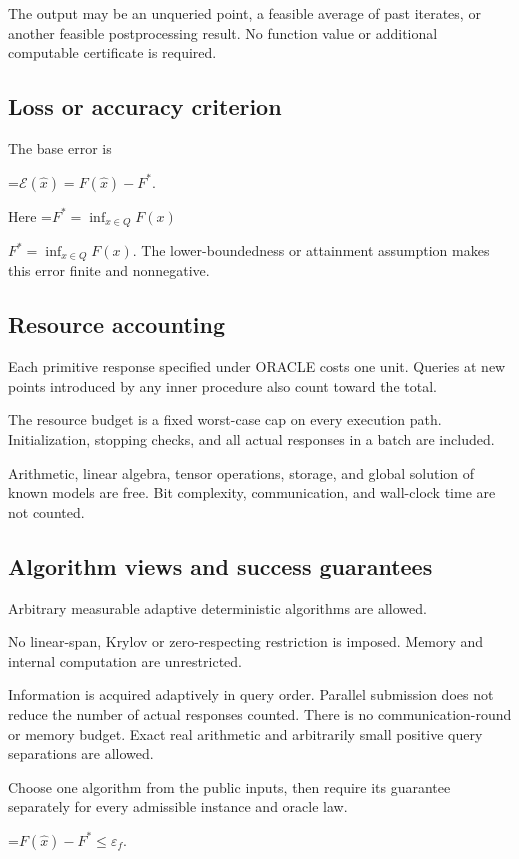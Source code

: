 \documentclass[10pt,a4paper]{article}
\newcommand{\AtlasMath}[1]{\par\begingroup\centering\setbox0=\hbox{$\displaystyle #1$}\ifdim\wd0>1.4\linewidth\typeout{ATLAS WIDE FORMULA: \the\wd0}\fi\ifdim\wd0>\linewidth\resizebox{\linewidth}{!}{\box0}\else\box0\fi\par\endgroup}
\newcommand{\AtlasInlineMath}[1]{\begingroup\setbox0=\hbox{$#1$}\ifdim\wd0>.4\linewidth\endgroup\AtlasMath{#1}\else\endgroup$#1$\fi}
\begin{document}
The output may be an unqueried point, a feasible average of past iterates, or another feasible postprocessing result. No function value or additional computable certificate is required.

\subsection{Loss or accuracy criterion}
The base error is


\AtlasMath{\mathcal{E}(\widehat{x})=F(\widehat{x})-F^*.}


Here \AtlasInlineMath{F^*=\inf_{x\in Q}F(x)}. The lower-boundedness or attainment assumption makes this error finite and nonnegative.

\subsection{Resource accounting}
Each primitive response specified under ORACLE costs one unit. Queries at new points introduced by any inner procedure also count toward the total.

The resource budget is a fixed worst-case cap on every execution path. Initialization, stopping checks, and all actual responses in a batch are included.

Arithmetic, linear algebra, tensor operations, storage, and global solution of known models are free. Bit complexity, communication, and wall-clock time are not counted.

\subsection{Algorithm views and success guarantees}
Arbitrary measurable adaptive deterministic algorithms are allowed.

No linear-span, Krylov or zero-respecting restriction is imposed. Memory and internal computation are unrestricted.

Information is acquired adaptively in query order. Parallel submission does not reduce the number of actual responses counted. There is no communication-round or memory budget. Exact real arithmetic and arbitrarily small positive query separations are allowed.

Choose one algorithm from the public inputs, then require its guarantee separately for every admissible instance and oracle law.


\AtlasMath{F(\widehat{x})-F^*\le \varepsilon_f.}
\end{document}
